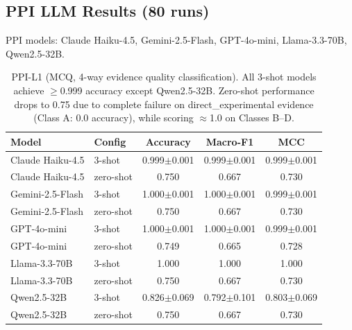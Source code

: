\clearpage

\subsection{PPI LLM Results (80 runs)}

PPI models: Claude Haiku-4.5, Gemini-2.5-Flash, GPT-4o-mini, Llama-3.3-70B, Qwen2.5-32B.

\begin{table}[h]
\centering
\caption{PPI-L1 (MCQ, 4-way evidence quality classification). All 3-shot models achieve $\geq$0.999 accuracy except Qwen2.5-32B. Zero-shot performance drops to 0.75 due to complete failure on direct\_experimental evidence (Class A: 0.0 accuracy), while scoring $\approx$1.0 on Classes B--D.}
\label{tab:ppi_l1_full}
\scriptsize
\begin{tabular}{@{}llccc@{}}
\toprule
\textbf{Model} & \textbf{Config} & \textbf{Accuracy} & \textbf{Macro-F1} & \textbf{MCC} \\
\midrule
Claude Haiku-4.5 & 3-shot & 0.999$\pm$0.001 & 0.999$\pm$0.001 & 0.999$\pm$0.001 \\
Claude Haiku-4.5 & zero-shot & 0.750 & 0.667 & 0.730 \\
Gemini-2.5-Flash & 3-shot & 1.000$\pm$0.001 & 1.000$\pm$0.001 & 0.999$\pm$0.001 \\
Gemini-2.5-Flash & zero-shot & 0.750 & 0.667 & 0.730 \\
GPT-4o-mini & 3-shot & 1.000$\pm$0.001 & 1.000$\pm$0.001 & 0.999$\pm$0.001 \\
GPT-4o-mini & zero-shot & 0.749 & 0.665 & 0.728 \\
Llama-3.3-70B & 3-shot & 1.000 & 1.000 & 1.000 \\
Llama-3.3-70B & zero-shot & 0.750 & 0.667 & 0.730 \\
Qwen2.5-32B & 3-shot & 0.826$\pm$0.069 & 0.792$\pm$0.101 & 0.803$\pm$0.069 \\
Qwen2.5-32B & zero-shot & 0.750 & 0.667 & 0.730 \\
\bottomrule
\end{tabular}
\end{table}

